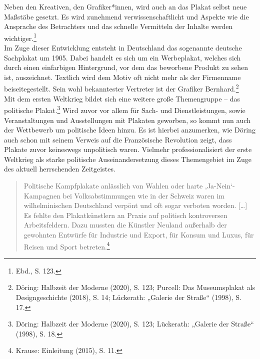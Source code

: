 \documentclass[a4paper,12pt,ngerman]{article}
\begin{document}
Neben den Kreativen, den Grafiker*innen, wird auch an das Plakat selbst neue Maßstäbe gesetzt. Es wird zunehmend verwissenschaftlicht und Aspekte wie die Ansprache des Betrachters und das schnelle Vermitteln der Inhalte werden wichtiger.\footnote{Ebd., S. 123.} \\
Im Zuge dieser Entwicklung entsteht in Deutschland das sogenannte deutsche Sachplakat um 1905. Dabei handelt es sich um ein Werbeplakat, welches sich durch einen einfarbigen Hintergrund, vor dem das beworbene Produkt zu sehen ist, auszeichnet. Textlich wird dem Motiv oft nicht mehr als der Firmenname beiseitegestellt. Sein wohl bekanntester Vertreter ist der Grafiker Bernhard.\footnote{Döring: Halbzeit der Moderne (2020), S. 123; Purcell: Das Museumsplakat als Designgeschichte (2018), S. 14; Lückerath: „Galerie der Straße“ (1998), S. 17.} \\
Mit dem ersten Weltkrieg bildet sich eine weitere große Themengruppe -- das politische Plakat.\footnote{Döring: Halbzeit der Moderne (2020), S. 123; Lückerath: „Galerie der Straße“ (1998), S. 18.}  Wird zuvor vor allem für Sach- und Dienstleistungen, sowie Veranstaltungen und Ausstellungen mit Plakaten geworben, so kommt nun auch der Wettbewerb um politische Ideen hinzu. Es ist hierbei anzumerken, wie Döring auch schon mit seinem Verweis auf die Französische Revolution zeigt, dass Plakate zuvor keineswegs unpolitisch waren. Vielmehr professionalisiert der erste Weltkrieg als starke politische Auseinandersetzung dieses Themengebiet im Zuge des aktuell herrschenden Zeitgeistes.

\blockquote{\fontsize{10pt}{12pt} \selectfont Politische Kampfplakate anlässlich von Wahlen oder harte ‚Ja-Nein‘-Kampagnen bei Volksabstimmungen wie in der Schweiz waren im wilhelminischen Deutschland verpönt und oft sogar verboten worden. […] Es fehlte den Plakatkünstlern an Praxis auf politisch kontroversen Arbeitsfeldern. Dazu mussten die Künstler Neuland außerhalb der gewohnten Entwürfe für Industrie und Export, für Konsum und Luxus, für Reisen und Sport betreten.\footnote{Krause: Einleitung (2015), S. 11.}}
\end{document}
